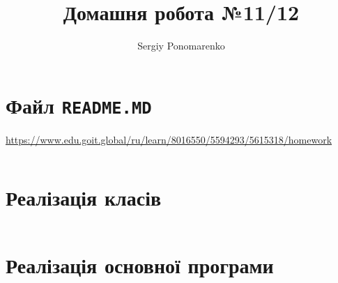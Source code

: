 \documentclass[14pt]{extarticle}
\title{Домашня робота №11/12}
\author{Sergiy Ponomarenko}
\begin{document}
\maketitle


\section{Файл \texttt{README.MD}}




\begin{center}\scriptsize
\url{https://www.edu.goit.global/ru/learn/8016550/5594293/5615318/homework}
\end{center}

\inputminted[fontsize=\scriptsize,%
 numbersep = 1pt,%
 breaklines=true,%
 framesep=1mm,%
 baselinestretch=0.95,%
 bgcolor=gray!5,%
 fontsize=\scriptsize,%
 linenos]{text}{readme.md}

 \section{Реалізація класів}

 \inputminted[fontsize=\scriptsize,%
  numbersep = 1pt,%
  breaklines=true,%
  framesep=1mm,%
  baselinestretch=0.95,%
  bgcolor=gray!5,%
  fontsize=\footnotesize,%
  linenos]{python}{botmodule.py}

 \section{Реалізація основної програми}

\inputminted[fontsize=\scriptsize,%
 numbersep = 1pt,%
 breaklines=true,%
 framesep=1mm,%
 baselinestretch=0.95,%
 bgcolor=gray!5,%
 fontsize=\footnotesize,%
 linenos]{python}{main.py}
\end{document}
